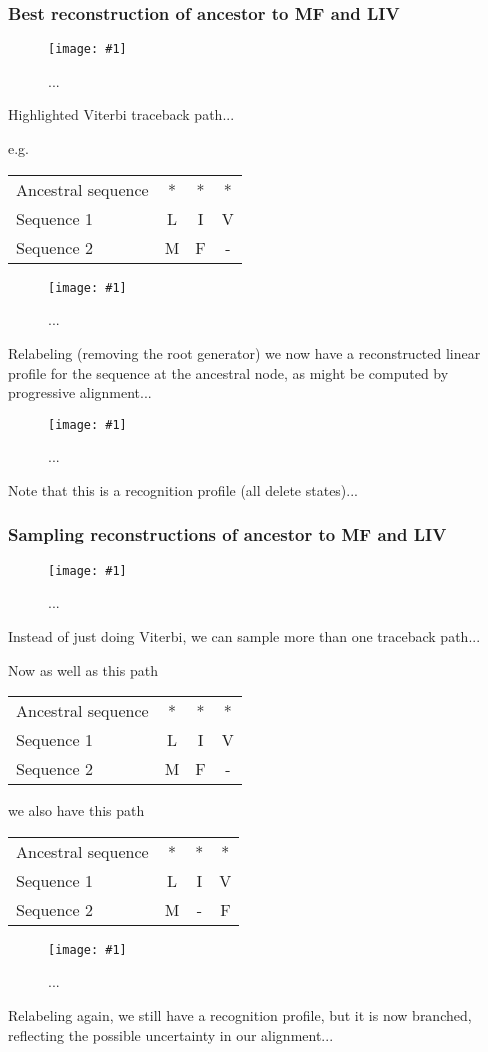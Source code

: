 \documentclass{article}
\newcommand{\figlabel}[1]{\label{Figures.#1}}
\newcommand{\easyfig}[4]{
\begin{figure}
\texttt{[image: \#1]}
\caption{ \figlabel{#3} #4}
\end{figure}}
\newcommand{\widepngfig}[2]{\easyfig{#1.png}{width=\textwidth}{#1}{#2}}
\newcommand{\widepdffig}[2]{\easyfig{#1-fig.pdf}{width=\textwidth}{#1}{#2}}
\newcommand{\tallpdffig}[2]{\easyfig{#1-fig.pdf}{height=\textheight}{#1}{#2}}
\begin{document}
\subsubsection{Best reconstruction of ancestor to MF and LIV}

\widepngfig{viterbi-root-fork-tkf91liv-tkf91mf}{...}

Highlighted Viterbi traceback path...

e.g.
\begin{tabular}{lccc}
Ancestral sequence & * & * & * \\
Sequence 1         & L & I & V \\
Sequence 2         & M & F & -
\end{tabular}

\widepdffig{viterbi-fork-tkf91liv-tkf91mf}{...}

Relabeling (removing the root generator) we now have a reconstructed linear profile
for the sequence at the ancestral node,
as might be computed by progressive alignment...

\tallpdffig{viterbi-profile}{...}

Note that this is a recognition profile (all delete states)...

\subsubsection{Sampling reconstructions of ancestor to MF and LIV}

\widepngfig{forward2-root-fork-tkf91liv-tkf91mf}{...}

Instead of just doing Viterbi, we can sample more than one traceback path...

Now as well as this path
\begin{tabular}{lccc}
Ancestral sequence & * & * & * \\
Sequence 1         & L & I & V \\
Sequence 2         & M & F & -
\end{tabular}

we also have this path
\begin{tabular}{lccc}
Ancestral sequence & * & * & * \\
Sequence 1         & L & I & V \\
Sequence 2         & M & - & F
\end{tabular}

\widepdffig{forward2-fork-tkf91liv-tkf91mf}{...}

Relabeling again, we still have a recognition profile, but it is now branched,
reflecting the possible uncertainty in our alignment...
\end{document}
